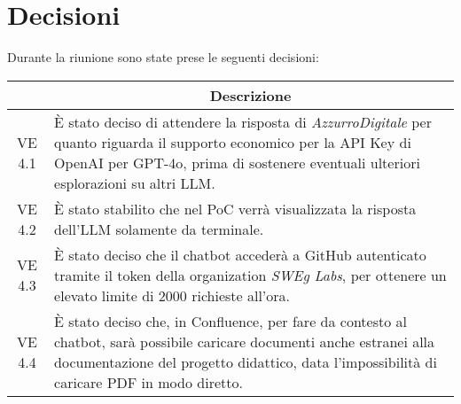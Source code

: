 

\section{Decisioni}

Durante la riunione sono state prese le seguenti decisioni:

\vspace{0.5cm}

\begin{table}[htbp]
    \centering
    \begin{tabular}{|c|p{}|}
        \hline
        \rowcolor[gray]{0.75}
        \multicolumn{1}{|c|}{\textbf{Codice}} & \multicolumn{1}{|c|}{\textbf{Descrizione}}\\
        \hline
        VE 4.1 & È stato deciso di attendere la risposta di \emph{AzzurroDigitale} per quanto riguarda il supporto economico
        per la API Key di OpenAI per GPT-4o, prima di sostenere eventuali ulteriori esplorazioni su altri LLM. \\
        \hline
        VE 4.2 & È stato stabilito che nel PoC verrà visualizzata la risposta dell'LLM solamente da terminale. \\
        \hline
        VE 4.3 & È stato deciso che il chatbot accederà a GitHub autenticato tramite il token della organization \emph{SWEg Labs},
        per ottenere un elevato limite di 2000 richieste all'ora. \\
        \hline
        VE 4.4 & È stato deciso che, in Confluence, per fare da contesto al chatbot, sarà possibile caricare documenti anche estranei alla documentazione del progetto didattico, 
        data l'impossibilità di caricare PDF in modo diretto. \\
        \hline
    \end{tabular}
\end{table}
